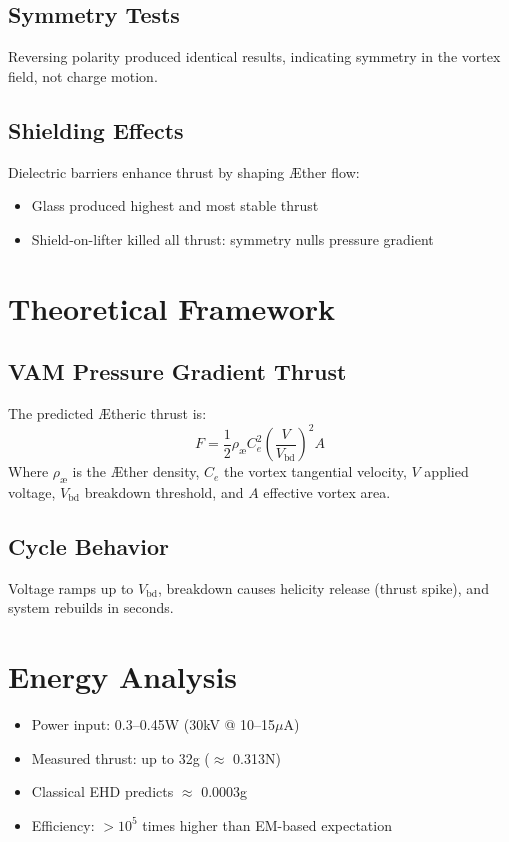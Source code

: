 \subsection{Symmetry Tests}
Reversing polarity produced identical results, indicating symmetry in the vortex field, not charge motion.

\subsection{Shielding Effects}
Dielectric barriers enhance thrust by shaping Æther flow:
\begin{itemize}
    \item Glass produced highest and most stable thrust
    \item Shield-on-lifter killed all thrust: symmetry nulls pressure gradient
\end{itemize}

\section{Theoretical Framework}
\subsection{VAM Pressure Gradient Thrust}
The predicted Ætheric thrust is:
\begin{equation}
    F = \frac{1}{2} \rho_\text{\ae} C_e^2 \left( \frac{V}{V_\text{bd}} \right)^2 A
\end{equation}
Where $\rho_\text{\ae}$ is the Æther density, $C_e$ the vortex tangential velocity, $V$ applied voltage, $V_\text{bd}$ breakdown threshold, and $A$ effective vortex area.


\subsection{Cycle Behavior}
Voltage ramps up to $V_\text{bd}$, breakdown causes helicity release (thrust spike), and system rebuilds in seconds.

\section{Energy Analysis}
\begin{itemize}
    \item Power input: 0.3--0.45W (30kV @ 10--15$\mu$A)
    \item Measured thrust: up to 32g ($\approx$ 0.313N)
    \item Classical EHD predicts $\approx$ 0.0003g
    \item Efficiency: $>10^5$ times higher than EM-based expectation
\end{itemize}

